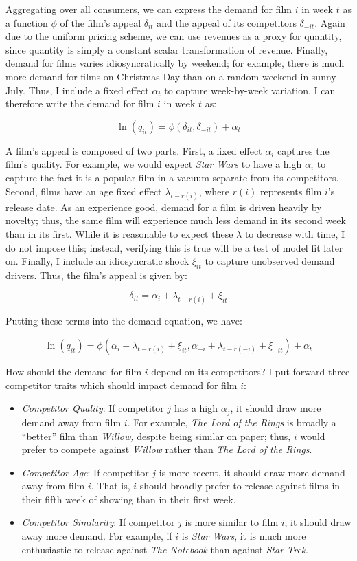\documentclass{article}
\begin{document}
Aggregating over all consumers, we can express the demand for film $i$ in week $t$ as a function $\phi$ of the film's appeal $\delta_{it}$ and the appeal of its competitors $\delta_{-it}$. Again due to the uniform pricing scheme, we can use revenues as a proxy for quantity, since quantity is simply a constant scalar transformation of revenue. Finally, demand for films varies idiosyncratically by weekend; for example, there is much more demand for films on Christmas Day than on a random weekend in sunny July. Thus, I include a fixed effect $\alpha_t$ to capture week-by-week variation. I can therefore write the demand for film $i$ in week $t$ as:

$$\ln(q_{it}) = \phi(\delta_{it}, \delta_{-it}) + \alpha_t$$

A film's appeal is composed of two parts. First, a fixed effect $\alpha_i$ captures the film's quality. For example, we would expect \emph{Star Wars} to have a high $\alpha_i$ to capture the fact it is a popular film in a vacuum separate from its competitors. Second, films have an age fixed effect $\lambda_{t - r(i)}$, where $r(i)$ represents film $i$'s release date. As an experience good, demand for a film is driven heavily by novelty; thus, the same film will experience much less demand in its second week than in its first. While it is reasonable to expect these $\lambda$ to decrease with time, I do not impose this; instead, verifying this is true will be a test of model fit later on. Finally, I include an idiosyncratic shock $\xi_{it}$ to capture unobserved demand drivers. Thus, the film's appeal is given by:

$$\delta_{it} = \alpha_i + \lambda_{t - r(i)} + \xi_{it}$$

Putting these terms into the demand equation, we have:

$$\ln(q_{it}) = \phi(\alpha_i + \lambda_{t - r(i)} + \xi_{it}, \alpha_{-i} + \lambda_{t - r(-i)} + \xi_{-it}) + \alpha_t$$

How should the demand for film $i$ depend on its competitors? I put forward three competitor traits which should impact demand for film $i$:
\begin{itemize}
    \item \emph{Competitor Quality}: If competitor $j$ has a high $\alpha_j$, it should draw more demand away from film $i$. For example, \emph{The Lord of the Rings} is broadly a ``better'' film than \emph{Willow,} despite being similar on paper; thus, $i$ would prefer to compete against \emph{Willow} rather than \emph{The Lord of the Rings}.
    \item \emph{Competitor Age}: If competitor $j$ is more recent, it should draw more demand away from film $i$. That is, $i$ should broadly prefer to release against films in their fifth week of showing than in their first week.
    \item \emph{Competitor Similarity}: If competitor $j$ is more similar to film $i$, it should draw away more demand. For example, if $i$ is \emph{Star Wars}, it is much more enthusiastic to release against \emph{The Notebook} than against \emph{Star Trek}.
\end{itemize}
\end{document}
